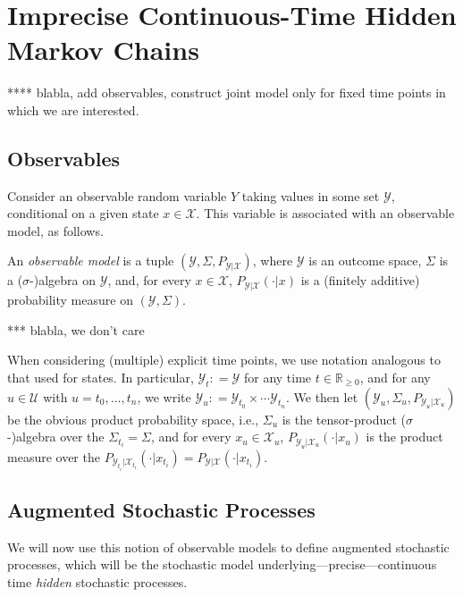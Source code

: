 \documentclass[twoside,11pt]{article}
\newcommand{\reals}{\mathbb{R}}
\newcommand{\realsnonneg}{\reals_{\geq 0}}
\newcommand{\states}{\mathcal{X}}
\newcommand{\observs}{\mathcal{Y}}
\newcommand{\coloneqq}{:\!=}
\begin{document}
\section{Imprecise Continuous-Time Hidden Markov Chains}\label{sec:icthmc}

**** blabla, add observables, construct joint model only for fixed time points in which we are interested.

\subsection{Observables}

Consider an observable random variable $Y$ taking values in some set $\observs$, conditional on a given state $x\in\states$. This variable is associated with an observable model, as follows.

\begin{definition}
An \emph{observable model} is a tuple $(\observs,\Sigma,P_{\observs\vert \states})$, where $\observs$ is an outcome space, $\Sigma$ is a ($\sigma$-)algebra on $\observs$, and, for every $x\in\states$, $P_{\observs\vert\states}(\cdot\vert x)$ is a (finitely additive) probability measure on $(\observs,\Sigma)$.
\end{definition}
*** blabla, we don't care

When considering (multiple) explicit time points, we use notation analogous to that used for states. In particular, $\observs_t\coloneqq\observs$ for any time $t\in\realsnonneg$, and for any $u\in\mathcal{U}$ with $u=t_0,\ldots,t_n$, we write $\observs_u\coloneqq \observs_{t_0}\times\cdots\observs_{t_n}$. We then let $(\observs_u,\Sigma_u,P_{\observs_u\vert\states_u})$ be the obvious product probability space, i.e., $\Sigma_u$ is the tensor-product ($\sigma$-)algebra over the $\Sigma_{t_i}=\Sigma$, and for every $x_u\in\states_u$, $P_{\observs_u\vert\states_u}(\cdot\vert x_u)$ is the product measure over the $P_{\observs_{t_i}\vert\states_{t_i}}(\cdot\vert x_{t_i})=P_{\observs\vert\states}(\cdot\vert x_{t_i})$.

\subsection{Augmented Stochastic Processes}\label{sec:aug_stochastic_processes}
We will now use this notion of observable models to define augmented stochastic processes, which will be the stochastic model underlying---precise---continuous time \emph{hidden} stochastic processes. 
\end{document}
